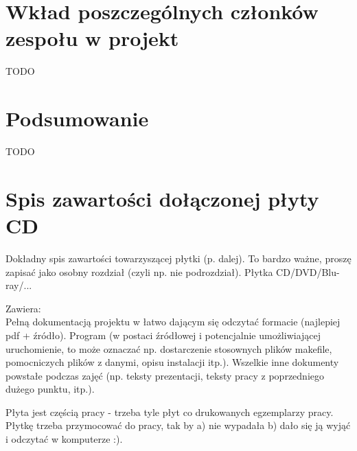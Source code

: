 \documentclass[licencjacka]{pracamgr}
\begin{document}
\chapter{Wkład poszczególnych członków zespołu w projekt}
TODO

\chapter{Podsumowanie}
TODO

\appendix
\chapter{Spis zawartości dołączonej płyty CD}
Dokładny spis zawartości towarzyszącej płytki (p. dalej). To bardzo ważne, proszę zapisać jako osobny rozdział (czyli np. nie podrozdział). Płytka CD/DVD/Blu-ray/...

Zawiera:\\
Pełną dokumentacją projektu w łatwo dającym się odczytać formacie (najlepiej pdf + źródło).
Program (w postaci źródłowej i potencjalnie umożliwiającej uruchomienie, to może oznaczać np. dostarczenie stosownych plików makefile, pomocniczych plików z danymi, opisu instalacji itp.).
Wszelkie inne dokumenty powstałe podczas zajęć (np. teksty prezentacji, teksty pracy z poprzedniego dużego punktu, itp.).

Płyta jest częścią pracy - trzeba tyle płyt co drukowanych egzemplarzy pracy. Płytkę trzeba przymocować do pracy, tak by a) nie wypadała b) dało się ją wyjąć i odczytać w komputerze :).

\end{document}
